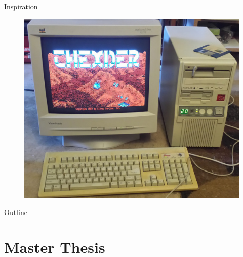 \documentclass{beamer}
\begin{document}
\begin{frame}{Inspiration}
\begin{itemize}
\begin{figure}
{				\includegraphics[height=0.2\textheight]{figures/PC286.jpg}
			}
       	  \end{figure} 
	\end{itemize}
\end{frame}

\begin{frame}{Outline}
	\tableofcontents
\end{frame}

\section{Master Thesis}
\end{document}
